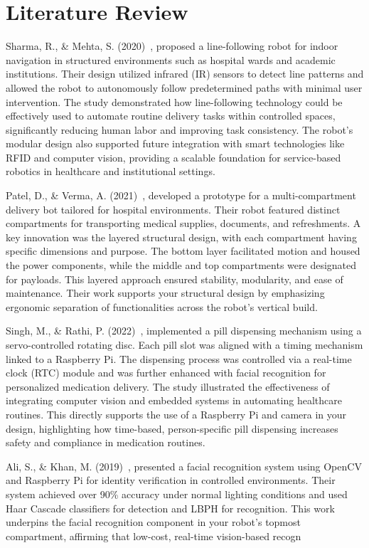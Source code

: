 \section{Literature Review}

Sharma, R., \& Mehta, S. (2020)~\cite{sharma2020}, proposed a line-following robot for indoor navigation in structured environments such as hospital wards and academic institutions. Their design utilized infrared (IR) sensors to detect line patterns and allowed the robot to autonomously follow predetermined paths with minimal user intervention. The study demonstrated how line-following technology could be effectively used to automate routine delivery tasks within controlled spaces, significantly reducing human labor and improving task consistency. The robot’s modular design also supported future integration with smart technologies like RFID and computer vision, providing a scalable foundation for service-based robotics in healthcare and institutional settings.

Patel, D., \& Verma, A. (2021)~\cite{patel2021}, developed a prototype for a multi-compartment delivery bot tailored for hospital environments. Their robot featured distinct compartments for transporting medical supplies, documents, and refreshments. A key innovation was the layered structural design, with each compartment having specific dimensions and purpose. The bottom layer facilitated motion and housed the power components, while the middle and top compartments were designated for payloads. This layered approach ensured stability, modularity, and ease of maintenance. Their work supports your structural design by emphasizing ergonomic separation of functionalities across the robot's vertical build.

Singh, M., \& Rathi, P. (2022)~\cite{singh2022}, implemented a pill dispensing mechanism using a servo-controlled rotating disc. Each pill slot was aligned with a timing mechanism linked to a Raspberry Pi. The dispensing process was controlled via a real-time clock (RTC) module and was further enhanced with facial recognition for personalized medication delivery. The study illustrated the effectiveness of integrating computer vision and embedded systems in automating healthcare routines. This directly supports the use of a Raspberry Pi and camera in your design, highlighting how time-based, person-specific pill dispensing increases safety and compliance in medication routines.

Ali, S., \& Khan, M. (2019)~\cite{ali2019}, presented a facial recognition system using OpenCV and Raspberry Pi for identity verification in controlled environments. Their system achieved over 90\% accuracy under normal lighting conditions and used Haar Cascade classifiers for detection and LBPH for recognition. This work underpins the facial recognition component in your robot’s topmost compartment, affirming that low-cost, real-time vision-based recogn

